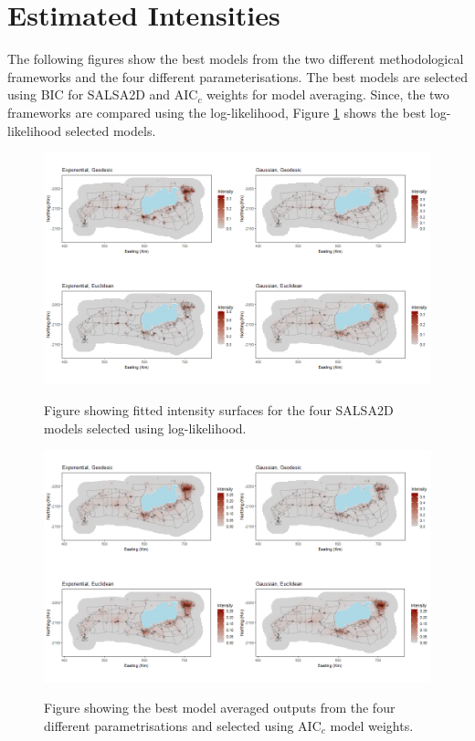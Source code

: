 \section{Estimated Intensities}

The following figures show the best models from the two different methodological frameworks and the four different parameterisations. The best models are selected using BIC for SALSA2D and AIC$_c$ weights for model averaging. Since, the two frameworks are compared using the log-likelihood, Figure \ref{fig:salsaloglik} shows the best log-likelihood selected models. 


\begin{figure}[!htb]
\centering
\caption{Figure showing fitted intensity surfaces for the four SALSA2D models selected using log-likelihood.}
\includegraphics[width=0.9\linewidth]{suppimages/mrseapredplots_4methods.png}
\label{fig:salsaloglik}
\end{figure}

\begin{figure}[!htb]
\centering
\caption{Figure showing the best model averaged outputs from the four different parametrisations and selected using AIC$_c$ model weights.}
\includegraphics[width=0.9\linewidth]{suppimages/modelavgpredplots.png}
\label{fig:modelavgall}
\end{figure}

